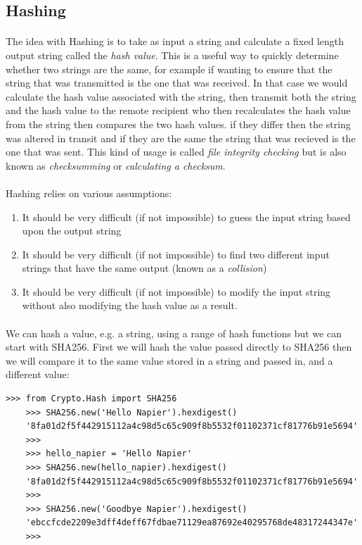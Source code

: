 \documentclass[12pt, a4paper, twoside]{book}
\begin{document}
\subsection{Hashing}
\paragraph{} The idea with Hashing is to take as input a string and calculate a fixed length output string called the \emph{hash value}. This is a useful way to quickly determine whether two strings are the same, for example if wanting to ensure that the string that was transmitted is the one that was received. In that case we would calculate the hash value associated with the string, then transmit both the string and the hash value to the remote recipient who then recalculates the hash value from the string then compares the two hash values. if they differ then the string was altered in transit and if they are the same the string that was recieved is the one that was sent. This kind of usage is called \emph{file integrity checking} but is also known as \emph{checksumming} or \emph{calculating a checksum}.

\paragraph{} Hashing relies on various assumptions:

\begin{enumerate}
\item It should be very difficult (if not impossible) to guess the input string based upon the output string
\item It should be very difficult (if not impossible) to find two different input strings that have the same output (known as a \emph{collision})
\item It should be very difficult (if not impossible) to modify the input string without also modifying the hash value as a result.
\end{enumerate}

\paragraph{} We can hash a value, e.g. a string, using a range of hash functions but we can start with SHA256. First we will hash the value passed directly to SHA256 then we will compare it to the same value stored in a string and passed in, and a different value:

\begin{lstlisting}[style=DOS]
    >>> from Crypto.Hash import SHA256
    >>> SHA256.new('Hello Napier').hexdigest()
    '8fa01d2f5f442915112a4c98d5c65c909f8b5532f01102371cf81776b91e5694'
    >>>
    >>> hello_napier = 'Hello Napier'
    >>> SHA256.new(hello_napier).hexdigest()
    '8fa01d2f5f442915112a4c98d5c65c909f8b5532f01102371cf81776b91e5694'
    >>> 
    >>> SHA256.new('Goodbye Napier').hexdigest()
    'ebccfcde2209e3dff4deff67fdbae71129ea87692e40295768de48317244347e'
    >>>
\end{lstlisting}
\end{document}
